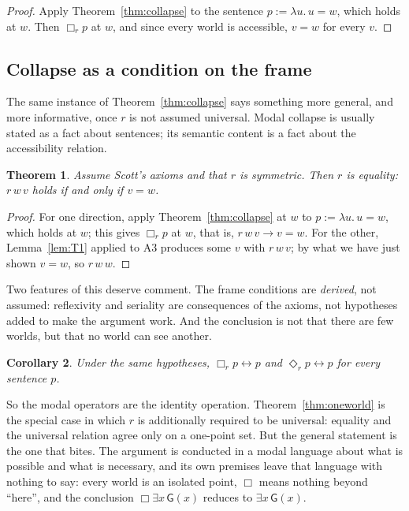 \documentclass[11pt]{article}
\theoremstyle{plain}
\newtheorem{theorem}{Theorem}
\newtheorem{corollary}[theorem]{Corollary}
\theoremstyle{definition}
\newcommand{\Gd}{\mathsf{G}}
\begin{document}
\begin{proof}
Apply Theorem~\ref{thm:collapse} to the sentence $p := \lambda u.\, u = w$,
which holds at $w$. Then $\Box_r p$ at $w$, and since every world is accessible,
$v = w$ for every $v$.
\end{proof}

\subsection{Collapse as a condition on the frame}\label{sec:frame}

The same instance of Theorem~\ref{thm:collapse} says something more general,
and more informative, once $r$ is not assumed universal. Modal collapse is
usually stated as a fact about sentences; its semantic content is a fact about
the accessibility relation.

\begin{theorem}\label{thm:frame}
Assume Scott's axioms and that $r$ is symmetric. Then $r$ is \emph{equality}:
$r\,w\,v$ holds if and only if $v = w$.
\end{theorem}

\begin{proof}
For one direction, apply Theorem~\ref{thm:collapse} at $w$ to
$p := \lambda u.\, u = w$, which holds at $w$; this gives $\Box_r p$ at $w$,
that is, $r\,w\,v \to v = w$. For the other, Lemma~\ref{lem:T1} applied to A3
produces some $v$ with $r\,w\,v$; by what we have just shown $v = w$, so
$r\,w\,w$.
\end{proof}

\noindent
Two features of this deserve comment. The frame conditions are \emph{derived},
not assumed: reflexivity and seriality are consequences of the axioms, not
hypotheses added to make the argument work. And the conclusion is not that
there are few worlds, but that no world can see another.

\begin{corollary}\label{cor:inert}
Under the same hypotheses, $\Box_r p \leftrightarrow p$ and
$\Diamond_r p \leftrightarrow p$ for every sentence $p$.
\end{corollary}

So the modal operators are the identity operation. Theorem~\ref{thm:oneworld}
is the special case in which $r$ is additionally required to be universal:
equality and the universal relation agree only on a one-point set. But the
general statement is the one that bites. The argument is conducted in a modal
language about what is possible and what is necessary, and its own premises
leave that language with nothing to say: every world is an isolated point,
$\Box$ means nothing beyond ``here'', and the conclusion
$\Box\exists x\,\Gd(x)$ reduces to $\exists x\,\Gd(x)$.
\end{document}
